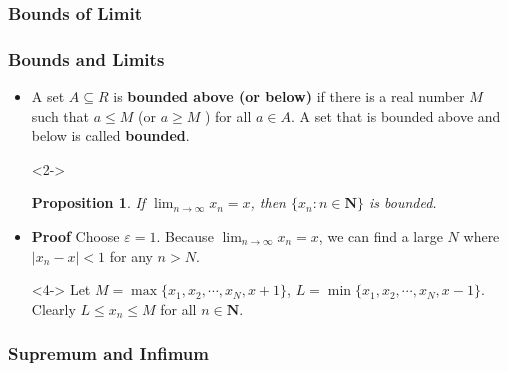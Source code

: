 \documentclass[handout]{beamer}
\newtheorem{Proposition}[theorem]{Proposition}
\begin{document}
\subsubsection{Bounds of Limit}

\frame
{
  \frametitle{Bounds and Limits}

  \begin{itemize}
  \item <1->   A set $A\subseteq R$ is \textbf{bounded above (or below) } if there is a real number $M$ such that $a\leq M$ (or $a\geq M$ ) for all $a\in A$.  A set that is bounded above and below is called \textbf{bounded}. 
  
  \item [] <2-> \begin{Proposition} If $\lim_{n\rightarrow\infty} x_n=x$, then $\{x_n: n\in \mathbf{N}\}$ is bounded. \end{Proposition} 
    \item<3-> \textbf{Proof} Choose $\varepsilon=1$. Because $\lim_{n\rightarrow\infty} x_n=x$, we can find a large $N$ where $|x_n-x|< 1$ for any $n>N$.
    \item[]<4-> Let $M=\max \{x_1,x_2,\cdots, x_N, x+1\}$, $L=\min \{x_1,x_2,\cdots, x_N, x-1\}$. Clearly $L\leq x_n\leq M$ for all $n\in \mathbf{N}$.
    

         
  \end{itemize}
}




\subsubsection{Supremum and Infimum}
\end{document}
